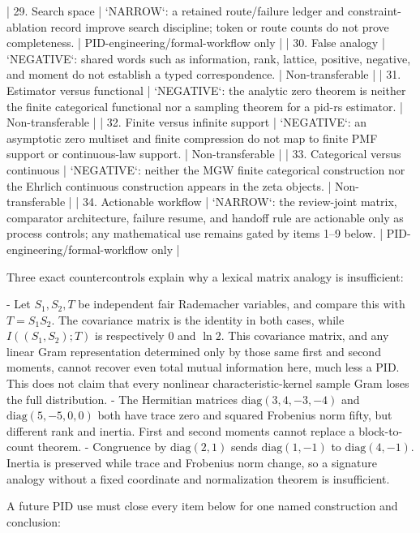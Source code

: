 \documentclass[11pt]{article}
\begin{document}
\begin{markdown}
| 29. Search space | `NARROW`: a retained route/failure ledger and constraint-ablation record improve search discipline; token or route counts do not prove completeness. | PID-engineering/formal-workflow only |
| 30. False analogy | `NEGATIVE`: shared words such as information, rank, lattice, positive, negative, and moment do not establish a typed correspondence. | Non-transferable |
| 31. Estimator versus functional | `NEGATIVE`: the analytic zero theorem is neither the finite categorical functional nor a sampling theorem for a pid-rs estimator. | Non-transferable |
| 32. Finite versus infinite support | `NEGATIVE`: an asymptotic zero multiset and finite compression do not map to finite PMF support or continuous-law support. | Non-transferable |
| 33. Categorical versus continuous | `NEGATIVE`: neither the MGW finite categorical construction nor the Ehrlich continuous construction appears in the zeta objects. | Non-transferable |
| 34. Actionable workflow | `NARROW`: the review-joint matrix, comparator architecture, failure resume, and handoff rule are actionable only as process controls; any mathematical use remains gated by items 1--9 below. | PID-engineering/formal-workflow only |

Three exact countercontrols explain why a lexical matrix analogy is insufficient:

- Let $S_1,S_2,T$ be independent fair Rademacher variables, and compare this with
  $T=S_1S_2$. The covariance matrix is the identity in both cases, while
  $I((S_1,S_2);T)$ is respectively $0$ and $\ln2$. This covariance matrix, and any linear Gram
  representation determined only by those same first and second moments, cannot recover even total
  mutual information here, much less a PID. This does not claim that every nonlinear
  characteristic-kernel sample Gram loses the full distribution.
- The Hermitian matrices $\mathrm{diag}(3,4,-3,-4)$ and
  $\mathrm{diag}(5,-5,0,0)$ both have trace zero and squared Frobenius norm fifty, but
  different rank and inertia. First and second moments cannot replace a block-to-count theorem.
- Congruence by $\mathrm{diag}(2,1)$ sends $\mathrm{diag}(1,-1)$ to
  $\mathrm{diag}(4,-1)$. Inertia is preserved while trace and Frobenius norm change, so a
  signature analogy without a fixed coordinate and normalization theorem is insufficient.

A future PID use must close every item below for one named construction and conclusion:


\end{markdown}
\end{document}
